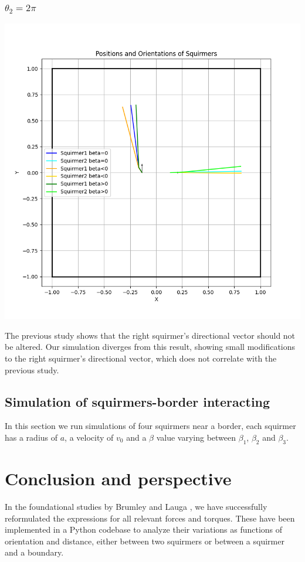 \documentclass{article}
\begin{document}
\subsubsection{$\theta_2 = 2\pi$}
\begin{center}
   \includegraphics[width=1\textwidth]{graphs/simulations/twosquirmerinter/sq2.2pi.png}
\end{center}
The previous study shows that the right squirmer's directional vector should not be altered. 
Our simulation diverges from this result, showing small modifications to the right squirmer's 
directional vector, which does not correlate with the previous study.

\subsection{Simulation of squirmers-border interacting}
In this section we run simulations of four squirmers near a border, each squirmer has a radius of $a$,
 a velocity of $v_0$ and a $\beta$ value varying between $\beta_1$, $\beta_2$ and $\beta_3$.

\section{Conclusion and perspective}
 In the foundational studies by Brumley \cite{Brumley} and Lauga \cite{Lauga}, we have successfully reformulated the expressions for all relevant forces and torques. These have been implemented in a Python codebase to analyze their variations as functions of orientation and distance, either between two squirmers or between a squirmer and a boundary.
 
\end{document}
